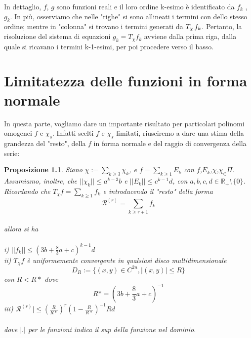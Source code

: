 \documentclass[a4paper,11pt,titlepage]{report}
\theoremstyle{definition}
\theoremstyle{plain}
\newtheorem{prop}{Proposizione}
\begin{document}
In dettaglio, $f$, $g$ sono funzioni reali e il loro ordine k-esimo è identificato da $f_k$ , $g_k$.
In più, osserviamo che nelle "righe" si sono allineati i termini con dello stesso ordine; mentre in "colonna" si trovano i termini generati da $T_\chi \hspace{0.5mm} f_k $. Pertanto, la risoluzione del sistema di equazioni $g_k=T_{\chi}f_k$ avviene dalla prima riga, dalla quale si ricavano i termini k-1-esimi, per poi procedere verso il basso.




\chapter{Limitatezza delle funzioni in forma normale}
In questa parte, vogliamo dare un importante risultato per particolari polinomi omogenei $f$ e $\chi_s$. Infatti scelti $f$ e $\chi_s$ limitati, riusciremo a dare una stima della grandezza del "resto", della $f$ in forma normale e del raggio di convergenza della serie\cite{1989}:
\begin{prop}
	\label{[prop:limResto]}
	Siano $ \chi := \sum_{k \geq 3}\chi_k $, e $f = \sum_{k \geq 1} E_k$ con $f$,$E_k$,$\chi $,$\chi_ \in \varPi$. Assumiamo, inoltre, che $||\chi_k|| \leq a^{k-3} b$ e $||E_k|| \leq c^{k-1} d$, con $a,b,c,d \in \mathbb{R}_+$\texttt{\textbackslash}$\{0\}$.
	Ricordando che $T_\chi f= \sum_{k\geq 1} f_k  $ e introducendo il "resto" della forma $$\mathcal{R}^{(r)}= \sum_{k \geq r+1} f_k$$\\
	allora si ha \\\\ i) $||f_k|| \leq (3b + \frac{8}{3} a + c)^{k-1} d$\\
	ii) $T_\chi f$ è uniformemente convergente in qualsiasi disco multidimensionale
	$$D_R := \{(x,y) \in C^{2n}, |(x,y)| \leq R\} $$ con $R < R*$ dove $$R*=(3b + \frac{8}{3} a + c)^{-1}$$
	iii) $\mathcal{R}^{(r)}| \leq (\frac{R}{R*} )^r (1-\frac{R}{R*})^{-1} Rd $
\\\\dove $|.|$ per le funzioni indica il sup della funzione nel dominio.



	\end{prop}

 
\end{document}
